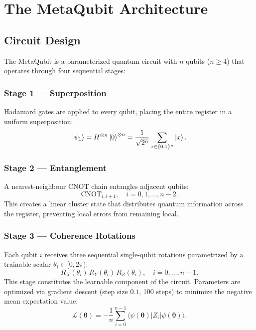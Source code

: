 \documentclass[twocolumn,amsmath,amssymb,prl]{revtex4-2}
\begin{document}
\section{The MetaQubit Architecture}
\label{sec:architecture}

\subsection{Circuit Design}

The MetaQubit is a parameterized quantum circuit with $n$ qubits ($n \geq 4$)
that operates through four sequential stages:

\subsubsection{Stage 1 — Superposition}

Hadamard gates are applied to every qubit, placing the entire register in a
uniform superposition:
\begin{equation}
  \ket{\psi_1} = H^{\otimes n} \ket{0}^{\otimes n}
               = \frac{1}{\sqrt{2^n}} \sum_{x \in \{0,1\}^n} \ket{x}.
\end{equation}

\subsubsection{Stage 2 — Entanglement}

A nearest-neighbour CNOT chain entangles adjacent qubits:
\begin{equation}
  \text{CNOT}_{i, i+1}, \quad i = 0, 1, \ldots, n-2.
\end{equation}
This creates a linear cluster state that distributes quantum information
across the register, preventing local errors from remaining local.

\subsubsection{Stage 3 — Coherence Rotations}

Each qubit $i$ receives three sequential single-qubit rotations parametrized
by a trainable scalar $\theta_i \in [0, 2\pi)$:
\begin{equation}
  R_X(\theta_i)\, R_Y(\theta_i)\, R_Z(\theta_i), \quad i = 0, \ldots, n-1.
\end{equation}
This stage constitutes the learnable component of the circuit.  Parameters are
optimized via gradient descent (step size $0.1$, 100 steps) to minimize the
negative mean expectation value:
\begin{equation}
  \mathcal{L}(\boldsymbol{\theta}) = -\frac{1}{n}\sum_{i=0}^{n-1}
  \langle \psi(\boldsymbol{\theta}) | Z_i | \psi(\boldsymbol{\theta}) \rangle.
\end{equation}
\end{document}
